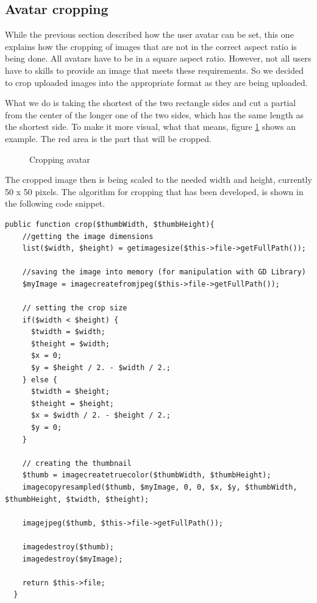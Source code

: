 \subsection{Avatar cropping}

While the previous section described how the user avatar can be set, this one explains how the cropping of images that are not in the correct aspect ratio is being done. All avatars have to be in a square aspect ratio. However, not all users have to skills to provide an image that meets these requirements. So we decided to crop uploaded images into the appropriate format as they are being uploaded.

What we do is taking the shortest of the two rectangle sides and cut a partial from the center of the longer one of the two sides, which has the same length as the shortest side. To make it more visual, what that means, figure \ref{fig:cropping-avatar} shows an example. The red area is the part that will be cropped.

\begin{figure}[!h]
  \centering
  \caption{Cropping avatar}
  \label{fig:cropping-avatar}
\end{figure}

The cropped image then is being scaled to the needed width and height, currently 50 x 50 pixels. The algorithm for cropping that has been developed, is shown in the following code snippet.

\begin{lstlisting}[caption=Cropping an image to a square aspect ratio]
public function crop($thumbWidth, $thumbHeight){
    //getting the image dimensions
    list($width, $height) = getimagesize($this->file->getFullPath());
    
    //saving the image into memory (for manipulation with GD Library)
    $myImage = imagecreatefromjpeg($this->file->getFullPath());

    // setting the crop size
    if($width < $height) {
      $twidth = $width;
      $theight = $width;
      $x = 0;
      $y = $height / 2. - $width / 2.;
    } else {
      $twidth = $height;
      $theight = $height;
      $x = $width / 2. - $height / 2.;
      $y = 0;
    }

    // creating the thumbnail
    $thumb = imagecreatetruecolor($thumbWidth, $thumbHeight);
    imagecopyresampled($thumb, $myImage, 0, 0, $x, $y, $thumbWidth, $thumbHeight, $twidth, $theight);

    imagejpeg($thumb, $this->file->getFullPath());

    imagedestroy($thumb);
    imagedestroy($myImage);

    return $this->file;
  }
\end{lstlisting}
